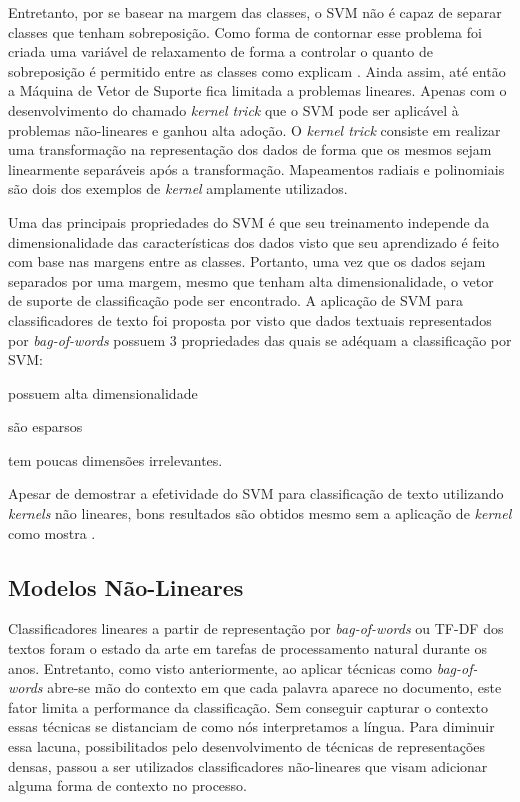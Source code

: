 Entretanto, por se basear na margem das classes, o SVM não é capaz de separar
classes que tenham sobreposição.
Como forma de contornar esse problema foi criada uma variável de relaxamento de
forma a controlar o quanto de sobreposição é permitido entre as classes como
explicam \citet{cortes95}.
Ainda assim, até então a Máquina de Vetor de Suporte fica limitada a problemas
lineares.
Apenas com o desenvolvimento do chamado \textit{kernel trick} que o SVM pode ser
aplicável à problemas não-lineares e ganhou alta adoção.
O \textit{kernel trick} consiste em realizar uma transformação na representação
dos dados de forma que os mesmos sejam linearmente separáveis após a
transformação.
Mapeamentos radiais e polinomiais são dois dos exemplos de \textit{kernel}
amplamente utilizados.

Uma das principais propriedades do SVM é que seu treinamento independe da
dimensionalidade das características dos dados visto que seu aprendizado é feito
com base nas margens entre as classes.
Portanto, uma vez que os dados sejam separados por uma margem, mesmo que tenham
alta dimensionalidade, o vetor de suporte de classificação pode ser encontrado.
A aplicação de SVM para classificadores de texto foi proposta por
\citet{joachims98} visto que dados textuais representados por
\textit{bag-of-words} possuem 3 propriedades das quais se adéquam a
classificação por SVM:
\begin {enumerate*} [label=\itshape\alph*\upshape)]
    \item possuem alta dimensionalidade
    \item são esparsos
    \item tem poucas dimensões irrelevantes.
\end {enumerate*}
Apesar de \citet{joachims98} demostrar a efetividade do SVM para classificação
de texto utilizando \textit{kernels} não lineares, bons resultados são obtidos
mesmo sem a aplicação de \textit{kernel} como mostra \citet{pang02}.

\subsection{Modelos Não-Lineares}

Classificadores lineares a partir de representação por \textit{bag-of-words} ou
TF-DF dos textos foram o estado da arte em tarefas de processamento natural
durante os anos.
Entretanto, como visto anteriormente, ao aplicar técnicas como
\textit{bag-of-words} abre-se mão do contexto em que cada palavra aparece no
documento, este fator limita a performance da classificação.
Sem conseguir capturar o contexto essas técnicas se distanciam de como nós
interpretamos a língua.
Para diminuir essa lacuna, possibilitados pelo desenvolvimento de técnicas de
representações densas, passou a ser utilizados classificadores não-lineares que
visam adicionar alguma forma de contexto no processo.

